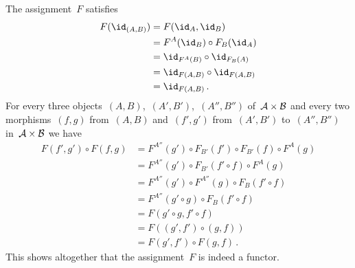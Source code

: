 The assignment~$F$ satisfies
\begin{align*}
	F( \id_{(A, B)} )
	&=
	F( \id_A, \id_B )
	\\
	&=
	F^A(\id_B) \circ F_B(\id_A)
	\\
	&=
	\id_{F^A(B)} \circ \id_{F_B(A)}
	\\
	&=
	\id_{F(A, B)} \circ \id_{F(A, B)}
	\\
	&=
	\id_{F(A, B)} \,.
\end{align*}
For every three objects~$(A, B)$,~$(A', B')$,~$(A'', B'')$ of~$\mathcal{A} \times \mathcal{B}$ and every two morphisms~$(f, g)$ from~$(A, B)$ and~$(f', g')$ from~$(A', B')$ to~$(A'', B'')$ in~$\mathcal{A} \times \mathcal{B}$ we have
\begin{align*}
	F(f', g') \circ F(f, g)
	&=
	F^{A''}(g') \circ F_{B'}(f') \circ F_{B'}(f) \circ F^A(g)
	\\
	&=
	F^{A''}(g') \circ F_{B'}(f' \circ f) \circ F^A(g)
	\\
	&=
	F^{A''}(g') \circ F^{A''}(g) \circ F_B(f' \circ f)
	\\
	&=
	F^{A''}(g' \circ g) \circ F_B(f' \circ f)
	\\
	&=
	F(g' \circ g, f' \circ f)
	\\
	&=
	F( (g', f') \circ (g, f) )
	\\
	&=
	F(g', f') \circ F(g, f) \,.
\end{align*}
This shows altogether that the assignment~$F$ is indeed a functor.




